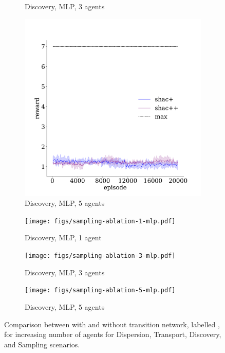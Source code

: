 \begin{figure}[!t]
\begin{subfigure}[b]{0.32\textwidth}
        \caption{Discovery, MLP, 3 agents}
        \label{fig:discovery-ablation-mlp-3}
    \end{subfigure}
    \begin{subfigure}[b]{0.32\textwidth}
        \includegraphics[width=\textwidth]{figs/discovery-ablation-5-mlp.pdf}
        \caption{Discovery, MLP, 5 agents}
        \label{fig:discovery-ablation-mlp-5}
    \end{subfigure}

    \begin{subfigure}[b]{0.30\textwidth}
        \texttt{[image: figs/sampling-ablation-1-mlp.pdf]}
        \caption{Discovery, MLP, 1 agent}
        \label{fig:sampling-ablation-mlp-1}
    \end{subfigure}
    \begin{subfigure}[b]{0.30\textwidth}
        \texttt{[image: figs/sampling-ablation-3-mlp.pdf]}
        \caption{Discovery, MLP, 3 agents}
        \label{fig:sampling-ablation-mlp-3}
    \end{subfigure}
    \begin{subfigure}[b]{0.30\textwidth}
        \texttt{[image: figs/sampling-ablation-5-mlp.pdf]}
        \caption{Discovery, MLP, 5 agents}
        \label{fig:sampling-ablation-mlp-5}
    \end{subfigure}

    \caption{Comparison between \fname{} with and without transition network, labelled \fnamer{}, for increasing number of agents for Dispersion, Transport, Discovery, and Sampling scenarios.}
    \label{fig:ablation}
\end{figure}

